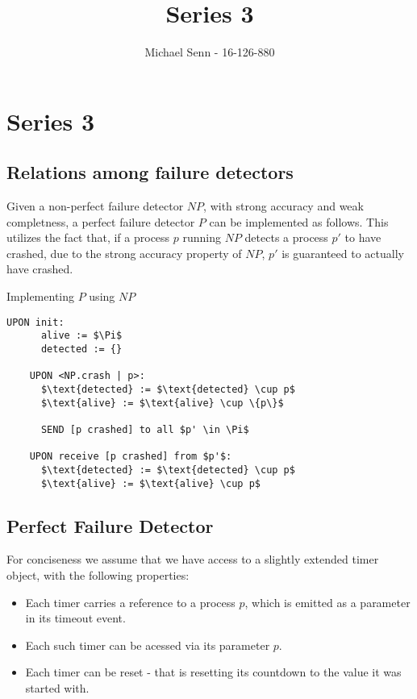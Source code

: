 \documentclass[a4paper]{scrreprt}
\title{Series 3}
\author{Michael Senn \maillink{michael.senn@students.unibe.ch} - 16-126-880}
\date{\printdate}
\begin{document}
\maketitle


\setcounter{chapter}{2}

\chapter{Series 3}

\section{Relations among failure detectors}

Given a non-perfect failure detector $NP$, with strong accuracy and weak
completness, a perfect failure detector $P$ can be implemented as follows. This
utilizes the fact that, if a process $p$ running $NP$ detects a process $p'$ to
have crashed, due to the strong accuracy property of $NP$, $p'$ is guaranteed
to actually have crashed.

\begin{library}{Implementing $P$ using $NP$}
  \begin{lstlisting}[mathescape=true,autogobble=true,breaklines=true]
    UPON init:
      alive := $\Pi$
      detected := {}

    UPON <NP.crash | p>:
      $\text{detected} := $\text{detected} \cup p$
      $\text{alive} := $\text{alive} \cup \{p\}$

      SEND [p crashed] to all $p' \in \Pi$

    UPON receive [p crashed] from $p'$:
      $\text{detected} := $\text{detected} \cup p$
      $\text{alive} := $\text{alive} \cup p$
  \end{lstlisting}
\end{library}

\section{Perfect Failure Detector}

For conciseness we assume that we have access to a slightly extended timer
object, with the following properties:
\begin{itemize}
  \item Each timer carries a reference to a process $p$, which is emitted as a
    parameter in its timeout event.
  \item Each such timer can be acessed via its parameter $p$.
  \item Each timer can be reset - that is resetting its countdown to the value
    it was started with.
\end{itemize}
\end{document}
